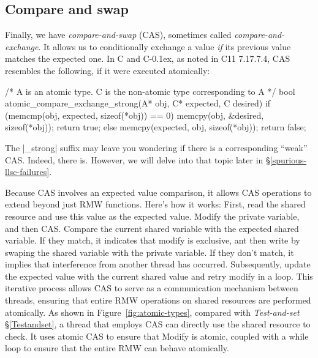 \documentclass[fontsize=10pt, oneside]{scrartcl}
\newcommand{\cplusplus}[1]{C\kern-0.1ex\raisebox{0.15ex}{\texttt{++}}#1}
\newcommand{\clang}[1]{C#1}
\newcommand{\fig}[1]{Figure~\ref{#1}}
\newcommand{\introduce}[1]{\textit{#1}}
\newcommand{\secref}[1]{\hyperref[#1]{\textsc{\S}\ref*{#1}}}
\begin{document}
\subsection{Compare and swap}
\label{cas}
Finally, we have \introduce{compare-and-swap} (\textsc{CAS}),
sometimes called \introduce{compare-and-exchange}.
It allows us to conditionally exchange a value \emph{if} its previous value matches the expected one.
In \clang{} and \cplusplus{}, as noted in C11 7.17.7.4, \textsc{CAS} resembles the following,
if it were executed atomically:
\begin{ccode}
/* A is an atomic type. C is the non-atomic type corresponding to A */
bool atomic_compare_exchange_strong(A* obj, C* expected, C desired)
{
    if (memcmp(obj, expected, sizeof(*obj)) == 0) {
        memcpy(obj, &desired, sizeof(*obj));
        return true;
    } else {
        memcpy(expected, obj, sizeof(*obj));
        return false;
    }
}
\end{ccode}

\begin{samepage}
\noindent The \cpp|_strong| suffix may leave you wondering if there is a corresponding ``weak'' \textsc{CAS}.
Indeed, there is. However, we will delve into that topic later in \secref{spurious-llsc-failures}.
\end{samepage}

Because \textsc{CAS} involves an expected value comparison, 
it allows \textsc{CAS} operations to extend beyond just \textsc{RMW} functions. 
Here's how it works: First, read the shared resource and use this value as the expected value. 
Modify the private variable, and then \textsc{CAS}. Compare the current shared variable with the expected shared variable. 
If they match, it indicates that modify is exclusive, ant then write by swaping the shared variable with the private variable.
If they don't match, it implies that interference from another thread has occurred.
Subsequently, update the expected value with the current shared value and retry modify in a loop. 
This iterative process allows \textsc{CAS} to serve as a communication mechanism between threads, 
ensuring that entire \textsc{RMW} operations on shared resources are performed atomically.
As shown in \fig{fig:atomic-types}, compared with \introduce{Test-and-set} \secref{Testandset}, 
a thread that employs \textsc{CAS} can directly use the shared resource to check.
It uses atomic \textsc{CAS} to ensure that Modify is atomic, 
coupled with a while loop to ensure that the entire \textsc{RMW} can behave atomically.
\end{document}
